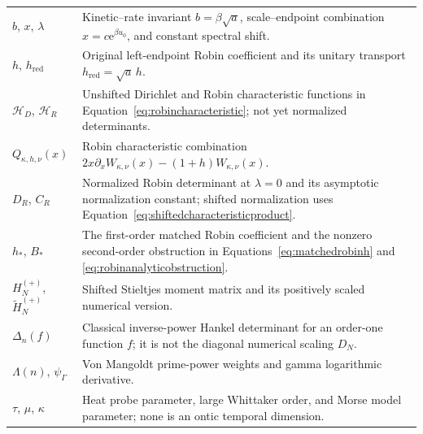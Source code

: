 \documentclass[11pt,letterpaper]{article}
\numberwithin{equation}{section}
\theoremstyle{definition}
\theoremstyle{remark}
\newcommand{\e}{\mathrm e}
\begin{document}
\begin{longtable}{P{0.25\textwidth}P{0.68\textwidth}}
$b$, $x$, $\lambda$ & Kinetic--rate invariant $b=\beta\sqrt a$, scale--endpoint combination $x=c\e^{\beta u_0}$, and constant spectral shift.\\
$h$, $h_{\mathrm{red}}$ & Original left-endpoint Robin coefficient and its unitary transport $h_{\mathrm{red}}=\sqrt a\,h$.\\
$\mathcal H_D$, $\mathcal H_R$ & Unshifted Dirichlet and Robin characteristic functions in Equation~\eqref{eq:robincharacteristic}; not yet normalized determinants.\\
$Q_{\kappa,h,\nu}(x)$ & Robin characteristic combination $2x\partial_xW_{\kappa,\nu}(x)-(1+h)W_{\kappa,\nu}(x)$.\\
$D_R$, $C_R$ & Normalized Robin determinant at $\lambda=0$ and its asymptotic normalization constant; shifted normalization uses Equation~\eqref{eq:shiftedcharacteristicproduct}.\\
$h_*$, $B_*$ & The first-order matched Robin coefficient and the nonzero second-order obstruction in Equations~\eqref{eq:matchedrobinh} and \eqref{eq:robinanalyticobstruction}.\\
$H_N^{(+)}$, $\widetilde H_N^{(+)}$ & Shifted Stieltjes moment matrix and its positively scaled numerical version.\\
$\Delta_n(f)$ & Classical inverse-power Hankel determinant for an order-one function $f$; it is not the diagonal numerical scaling $D_N$.\\
$\Lambda(n)$, $\psi_\Gamma$ & Von Mangoldt prime-power weights and gamma logarithmic derivative.\\
$\tau$, $\mu$, $\kappa$ & Heat probe parameter, large Whittaker order, and Morse model parameter; none is an ontic temporal dimension.\\
\bottomrule
\end{longtable}
\end{document}
